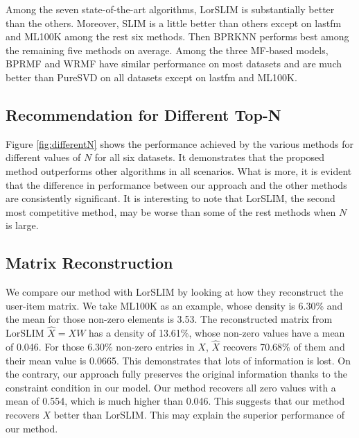 \documentclass[letterpaper]{article}
\begin{document}
Among the seven state-of-the-art algorithms, LorSLIM is substantially better than the others. Moreover, SLIM is a little better than others except on lastfm and ML100K among the rest six methods. Then BPRKNN performs best among the remaining five methods on average.  Among the three MF-based models, BPRMF and WRMF have similar performance on most datasets and are much better than PureSVD on all datasets except on lastfm and ML100K.
\subsection{Recommendation for Different Top-N}

Figure \ref{fig:differentN} shows the performance achieved by the various methods for different values of $N$ for all six datasets. It demonstrates that the proposed method outperforms other algorithms in all scenarios. What is more, it is evident that the difference in performance between our approach and the other methods are consistently significant. It is interesting to note that LorSLIM, the second most competitive method, may be worse than some of the rest methods when $N$ is large.  
\subsection{Matrix Reconstruction}
We compare our method with LorSLIM by looking at how they reconstruct the user-item matrix. We take ML100K as an example, whose density is 6.30\% and the mean for those non-zero elements is 3.53. The reconstructed matrix from LorSLIM $\hat{X}=XW$ has a density of 13.61\%, whose non-zero values have a mean of 0.046. For those 6.30\% non-zero entries in $X$, $\hat{X}$ recovers 70.68\% of them and their mean value is 0.0665. This demonstrates that lots of information is lost. On the contrary, our approach fully preserves the original information thanks to the constraint condition in our model. Our method recovers all zero values with a mean of 0.554, which is much higher than 0.046. This suggests that our method recovers $X$ better than LorSLIM. This may explain the superior performance of our method.
\end{document}
